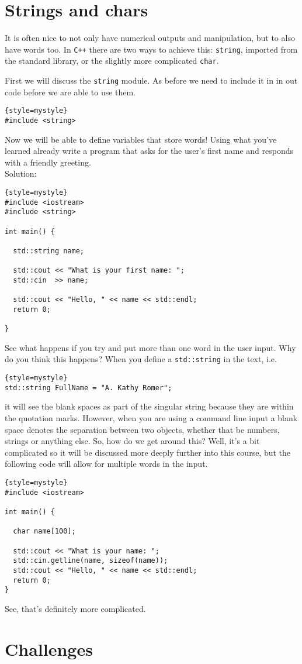 \section{Strings and chars}
It is often nice to not only have numerical outputs and manipulation, but to also have words too.
In \texttt{C++} there are two ways to achieve this: \texttt{string}, imported from the standard library, or the slightly more complicated \texttt{char}.

First we will discuss the \texttt{string} module.
As before we need to include it in in out code before we are able to use them.
\begin{lstlisting}{style=mystyle}
#include <string>
\end{lstlisting}
Now we will be able to define variables that store words!
Using what you've learned already write a program that asks for the user's first name and responds with a friendly greeting.
\\
Solution:
\begin{lstlisting}{style=mystyle}
#include <iostream>
#include <string>

int main() {
  
  std::string name;
  
  std::cout << "What is your first name: ";
  std::cin  >> name;
  
  std::cout << "Hello, " << name << std::endl;
  return 0;
  
}
\end{lstlisting}
See what happens if you try and put more than one word in the user input.
Why do you think this happens?
When you define a \texttt{std::string} in the text, i.e.
\begin{lstlisting}{style=mystyle}
std::string FullName = "A. Kathy Romer";
\end{lstlisting}
it will see the blank spaces as part of the singular string because they are within the quotation marks.
However, when you are using a command line input a blank space denotes the separation between two objects, whether that be numbers, strings or anything else.
So, how do we get around this?
Well, it's a bit complicated so it will be discussed more deeply further into this course, but the following code will allow for multiple words in the input.
\begin{lstlisting}{style=mystyle}
#include <iostream>

int main() {
  
  char name[100];
  
  std::cout << "What is your name: ";
  std::cin.getline(name, sizeof(name));
  std::cout << "Hello, " << name << std::endl;
  return 0;
}
\end{lstlisting}
See, that's definitely more complicated.
















\section{Challenges}
